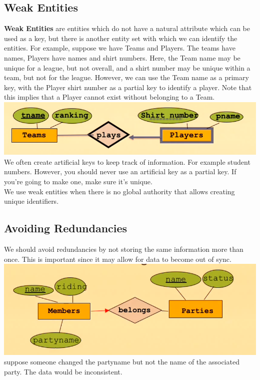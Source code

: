 \documentclass[12pt]{article}
\theoremstyle{definition}
\begin{document}
\subsection{Weak Entities}
\textbf{Weak Entities} are entities which do not have a natural attribute which can be used as a key, but there is another entity set with which we can identify the entities. For example, suppose we have Teams and Players. The teams have names, Players have names and shirt numbers. Here, the Team name may be unique for a league, but not overall, and a shirt number may be unique within a team, but not for the league. However, we can use the Team name as a primary key, with the Player shirt number as a partial key to identify a player. Note that this implies that a Player cannot exist without belonging to a Team.
\\ \includegraphics{weak-entity}\\
We often create artificial keys to keep track of information. For example student numbers. However, you should never use an artificial key as a partial key. If you're going to make one, make sure it's unique.
\\ \linebreak
We use weak entities when there is no global authority that allows creating unique identifiers.
\\ \linebreak
\subsection{Avoiding Redundancies}
We should avoid redundancies by not storing the same information more than once. This is important since it may allow for data to become out of sync. 
\\ \includegraphics{redundant}\\
suppose someone changed the partyname but not the name of the associated party. The data would be inconsistent.
\\ \linebreak
\end{document}
